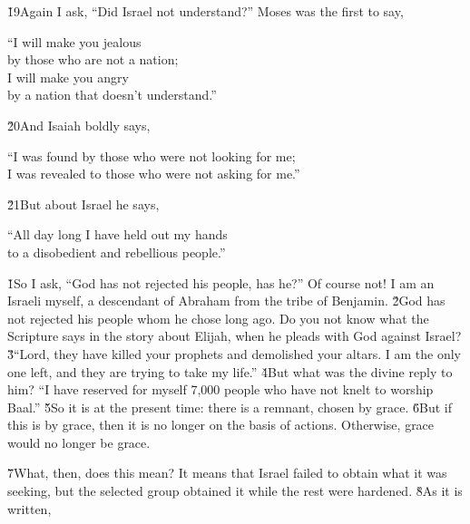 \v{19}Again I ask, ``Did Israel not understand?'' Moses was the first to say,

\begin{poetry}
\poeml ``I will make you jealous \\
\poemll    by those who are not a nation; \\
\poeml I will make you angry \\
\poemll    by a nation that doesn't understand.''
\end{poetry}

\v{20}And Isaiah boldly says,

\begin{poetry}
\poeml ``I was found by those who were not looking for me; \\
\poemll    I was revealed to those who were not asking for me.''
\end{poetry}

\v{21}But about Israel he says,

\begin{poetry}
\poeml ``All day long I have held out my hands \\
\poemll    to a disobedient and rebellious people.''
\end{poetry}

\v{1}So I ask, ``God has not rejected his people, has he?'' Of course not! I am an Israeli myself, a descendant of Abraham from the tribe of Benjamin. \v{2}God has not rejected his people whom he chose long ago. Do you not know what the Scripture says in the story about Elijah, when he pleads with God against Israel? \v{3}``Lord, they have killed your prophets and demolished your altars. I am the only one left, and they are trying to take my life.'' \v{4}But what was the divine reply to him? ``I have reserved for myself 7,000 people who have not knelt to worship Baal.'' \v{5}So it is at the present time: there is a remnant, chosen by grace. \v{6}But if this is by grace, then it is no longer on the basis of actions. Otherwise, grace would no longer be grace.

\v{7}What, then, does this mean? It means that Israel failed to obtain what it was seeking, but the selected group obtained it while the rest were hardened. \v{8}As it is written,


